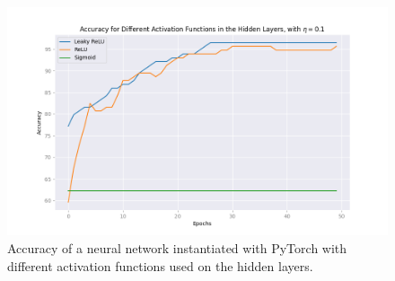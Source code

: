 \begin{figure}[h!]
    \centering
    \includegraphics[width=\linewidth]{figures/all_plots/activationfunctions_cost.png}
    \caption{Accuracy of a neural network instantiated with PyTorch with different activation functions used on the hidden layers.}
    \label{fig:activationfunctions_cost}
\end{figure}